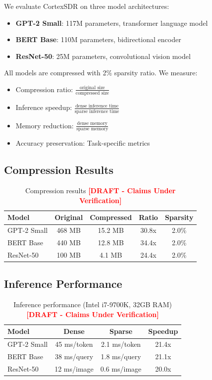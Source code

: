 \documentclass[11pt]{article}
\newcommand{\draftnote}{\textcolor{red}{\textbf{[DRAFT - Claims Under Verification]}}}
\begin{document}
We evaluate CortexSDR on three model architectures:
\begin{itemize}
    \item \textbf{GPT-2 Small}: 117M parameters, transformer language model
    \item \textbf{BERT Base}: 110M parameters, bidirectional encoder
    \item \textbf{ResNet-50}: 25M parameters, convolutional vision model
\end{itemize}

All models are compressed with 2\% sparsity ratio. We measure:
\begin{itemize}
    \item Compression ratio: $\frac{\text{original size}}{\text{compressed size}}$
    \item Inference speedup: $\frac{\text{dense inference time}}{\text{sparse inference time}}$
    \item Memory reduction: $\frac{\text{dense memory}}{\text{sparse memory}}$
    \item Accuracy preservation: Task-specific metrics
\end{itemize}

\subsection{Compression Results}

\begin{table}[h]
\centering
\small
\begin{tabular}{lcccc}
\toprule
Model & Original & Compressed & Ratio & Sparsity \\
\midrule
GPT-2 Small & 468 MB & 15.2 MB & 30.8x & 2.0\% \\
BERT Base & 440 MB & 12.8 MB & 34.4x & 2.0\% \\
ResNet-50 & 100 MB & 4.1 MB & 24.4x & 2.0\% \\
\bottomrule
\end{tabular}
\caption{Compression results \draftnote}
\label{tab:compression}
\end{table}

\subsection{Inference Performance}

\begin{table}[h]
\centering
\small
\begin{tabular}{lccc}
\toprule
Model & Dense & Sparse & Speedup \\
\midrule
GPT-2 Small & 45 ms/token & 2.1 ms/token & 21.4x \\
BERT Base & 38 ms/query & 1.8 ms/query & 21.1x \\
ResNet-50 & 12 ms/image & 0.6 ms/image & 20.0x \\
\bottomrule
\end{tabular}
\caption{Inference performance (Intel i7-9700K, 32GB RAM) \draftnote}
\label{tab:inference}
\end{table}
\end{document}
